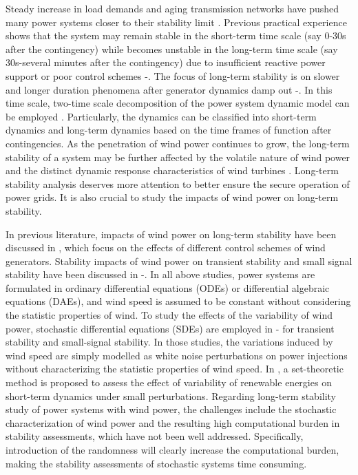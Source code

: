 \documentclass[journal]{IEEEtran}
\begin{document}
Steady increase in load demands and aging transmission networks have pushed many power systems closer to their stability limit \cite{Chiang:book}. Previous practical experience shows that the system may remain stable in the short-term time scale (say 0-30s after the contingency) while becomes unstable in the long-term time scale (say 30s-several minutes after the contingency) due to insufficient reactive power support or poor control schemes \cite{Cutsem:book}-\cite{Andersson:1993}. The focus of long-term stability is on slower and longer duration phenomena after generator dynamics damp out \cite{Kundur:book}-\cite{Kundur:1993}. In this time scale, two-time scale decomposition of the power system dynamic model can be employed \cite{Cutsem:book}\cite{Cutsem:article2000}. Particularly, the dynamics can be classified into short-term dynamics and long-term dynamics based on the time frames of function after contingencies.
As the penetration of wind power continues to grow, the long-term stability of a system may be further affected by the volatile nature of wind power and the distinct dynamic response characteristics of wind turbines \cite{Kling:2001}. Long-term stability analysis deserves more attention to better ensure the secure operation of power grids. It is also crucial to study the impacts of wind power on long-term stability.

In previous literature, impacts of wind power on long-term stability have been discussed in \cite{Vieira:2015}\cite{Bezerra:2012}, which focus on the effects of different control schemes of wind generators. Stability impacts of wind power on transient stability and small signal stability have been discussed in \cite{Rodriguez:2003}-\cite{Loparo:2011}. In all above studies, power systems are formulated in ordinary differential equations (ODEs) or differential algebraic equations (DAEs), and wind speed is assumed to be constant without considering the statistic properties of wind. To study the effects of the variability of wind power, stochastic differential equations (SDEs) are employed in \cite{crow:2012}-\cite{Nwankpa:2000} for transient stability and small-signal stability. In those studies, the variations induced by wind speed are simply modelled as white noise perturbations on power injections without characterizing the statistic properties of wind speed. In \cite{Chen:2012}, a set-theoretic method is proposed to assess the effect of variability of renewable energies on short-term dynamics under small perturbations.
Regarding long-term stability study of power systems with wind power, the challenges include the stochastic characterization of wind power and the resulting high computational burden in stability assessments, which have not been well addressed. Specifically, introduction of the randomness will clearly increase the computational burden, making the stability assessments of stochastic systems time consuming. 
\end{document}
